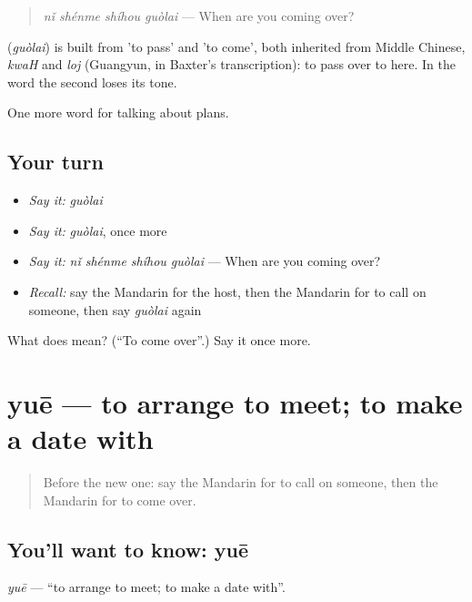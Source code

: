 \begin{quote}
\textbf{} \emph{nǐ shénme shíhou guòlai} — When are you coming over?
\end{quote}

\begin{cousinweb}
\textbf{} (\emph{guòlai}) is built from  'to pass' and  'to come', both inherited from Middle Chinese, \emph{kwaH} and \emph{loj} (Guangyun, in Baxter's transcription): to pass over to here. In the word the second loses its tone.
\end{cousinweb}

\begin{grammarlens}[title={What you've built}]
One more word for talking about plans.
\end{grammarlens}

\subsection*{Your turn}
\begin{itemize}
\raggedright
  \item \emph{Say it:} \emph{guòlai}
  \item \emph{Say it:} \emph{guòlai}, once more
  \item \emph{Say it:} \emph{nǐ shénme shíhou guòlai} — When are you coming over?
  \item \emph{Recall:} say the Mandarin for the host, then the Mandarin for to call on someone, then say \emph{guòlai} again
\end{itemize}

\begin{tcolorbox}[breakable,colback=teal!4,colframe=teal!35!black,title={Before you move on}]
What does  mean? (\textquotedblleft{}To come over\textquotedblright{}.) Say it once more.
\end{tcolorbox}
\section[yuē]{yuē — to arrange to meet; to make a date with}

\label{lesson:ZH-C180-yue}



\begin{quote}
Before the new one: say the Mandarin for to call on someone, then the Mandarin for to come over.
\end{quote}

\subsection*{You'll want to know: yuē}
\emph{yuē} — \textquotedblleft{}to arrange to meet; to make a date with\textquotedblright{}.

